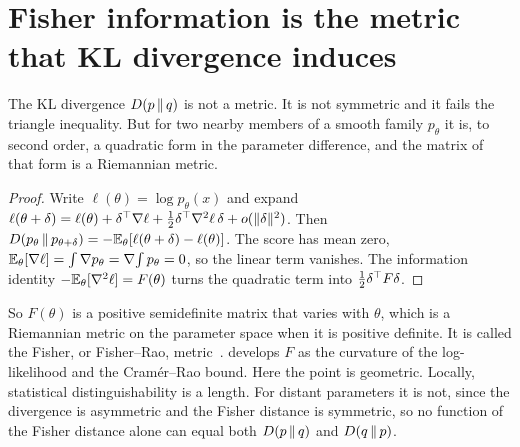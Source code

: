 
\section{Fisher information is the metric that KL divergence induces}\label{sec:ch05:fisher}

The KL divergence $D\!\left(p\,\middle\|\,q\right)$ is not a metric. It is not symmetric and it fails the triangle inequality. But for two nearby members of a smooth family $p_\theta$ it is, to second order, a quadratic form in the parameter difference, and the matrix of that form is a Riemannian metric.


\begin{proof}
Write $\ell(\theta)=\log p_\theta(x)$ and expand $\ell(\theta+\delta)=\ell(\theta)+\delta^{\top}\nabla\ell+\tfrac12\delta^{\top}\nabla^2\ell\,\delta+o(\lVert \delta\rVert^2)$. Then $D\!\left(p_\theta\,\middle\|\,p_{\theta+\delta}\right)=-\mathbb{E}_\theta[\ell(\theta+\delta)-\ell(\theta)]$. The score has mean zero, $\mathbb{E}_\theta[\nabla\ell]=\int\nabla p_\theta=\nabla\!\int p_\theta=0$, so the linear term vanishes. The information identity $-\mathbb{E}_\theta[\nabla^2\ell]=F(\theta)$ turns the quadratic term into $\tfrac12\delta^{\top} F\delta$.
\end{proof}

So $F(\theta)$ is a positive semidefinite matrix that varies with $\theta$, which is a Riemannian metric on the parameter space when it is positive definite. It is called the Fisher, or Fisher--Rao, metric~\cite{amari2016}.  develops $F$ as the curvature of the log-likelihood and the Cram\'er--Rao bound. Here the point is geometric. Locally, statistical distinguishability is a length. For distant parameters it is not, since the divergence is asymmetric and the Fisher distance is symmetric, so no function of the Fisher distance alone can equal both $D\!\left(p\,\middle\|\,q\right)$ and $D\!\left(q\,\middle\|\,p\right)$.

